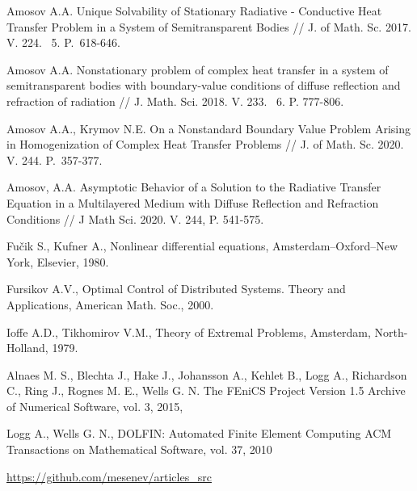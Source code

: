 \documentclass[12pt]{article}
\begin{document}
\begin{thebibliography}{999}
Amosov A.A. Unique Solvability of Stationary Radiative - Conductive Heat Transfer
Problem in a System of Semitransparent Bodies // J. of Math. Sc. 2017. V. 224. \textnumero~5. P.~618-646.

Amosov A.A. Nonstationary problem of complex heat transfer in a system of semitransparent bodies with boundary-value conditions of diffuse reflection and refraction of radiation // J. Math. Sci. 2018. V. 233. \textnumero~6. P. 777-806.

Amosov A.A., Krymov N.E. On a Nonstandard Boundary Value Problem Arising in Homogenization of Complex Heat Transfer Problems // J. of Math. Sc. 2020. V. 244. P.~357-377.

Amosov, A.A. Asymptotic Behavior of a Solution to the Radiative Transfer Equation in a Multilayered Medium with Diffuse Reflection and Refraction Conditions // J Math Sci. 2020. V. 244, P. 541-575.

         Fu\v{c}ik S., Kufner A., Nonlinear differential equations,
       Amsterdam--Oxford--New York,  Elsevier, 1980.

         Fursikov A.V., Optimal Control of Distributed
        Systems. Theory and Applications, American Math. Soc., 2000.

         Ioffe A.D., Tikhomirov V.M., Theory of Extremal
        Problems, Amsterdam, North-Holland, 1979.

         Alnaes M. S., Blechta  J., Hake J., Johansson A.,
        Kehlet B., Logg A., Richardson C., Ring J., Rognes M. E., Wells G. N.
        The FEniCS Project Version 1.5
        Archive of Numerical Software, vol. 3, 2015,

         Logg A., Wells G. N., DOLFIN: Automated Finite Element Computing
        ACM Transactions on Mathematical Software, vol. 37, 2010

         \url{https://github.com/mesenev/articles_src}


    \end{thebibliography}
\end{document}
